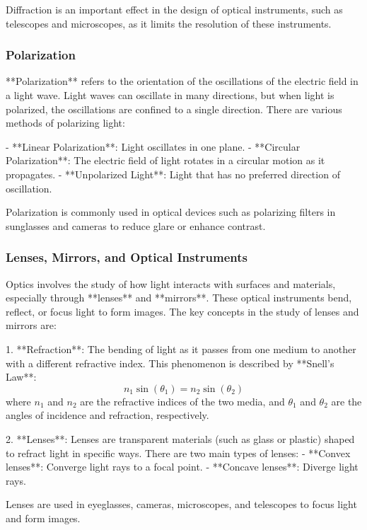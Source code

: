 \documentclass{article}
\begin{document}
Diffraction is an important effect in the design of optical instruments, such as telescopes and microscopes, as it limits the resolution of these instruments.

\subsubsection*{Polarization}

**Polarization** refers to the orientation of the oscillations of the electric field in a light wave. Light waves can oscillate in many directions, but when light is polarized, the oscillations are confined to a single direction. There are various methods of polarizing light:

- **Linear Polarization**: Light oscillates in one plane.
- **Circular Polarization**: The electric field of light rotates in a circular motion as it propagates.
- **Unpolarized Light**: Light that has no preferred direction of oscillation.

Polarization is commonly used in optical devices such as polarizing filters in sunglasses and cameras to reduce glare or enhance contrast.

\subsubsection*{Lenses, Mirrors, and Optical Instruments}

Optics involves the study of how light interacts with surfaces and materials, especially through **lenses** and **mirrors**. These optical instruments bend, reflect, or focus light to form images. The key concepts in the study of lenses and mirrors are:

1. **Refraction**: The bending of light as it passes from one medium to another with a different refractive index. This phenomenon is described by **Snell’s Law**:
   \[
   n_1 \sin(\theta_1) = n_2 \sin(\theta_2)
   \]
   where \( n_1 \) and \( n_2 \) are the refractive indices of the two media, and \( \theta_1 \) and \( \theta_2 \) are the angles of incidence and refraction, respectively.

2. **Lenses**: Lenses are transparent materials (such as glass or plastic) shaped to refract light in specific ways. There are two main types of lenses:
   - **Convex lenses**: Converge light rays to a focal point.
   - **Concave lenses**: Diverge light rays.

   Lenses are used in eyeglasses, cameras, microscopes, and telescopes to focus light and form images.
\end{document}
